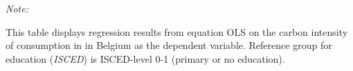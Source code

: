 \begin{table}[htbp!]
\begin{adjustbox}{width = 1\textwidth, max height = 0.95\textheight, center}
\begin{threeparttable}[b]
         \begin{tablenotes}\item \medskip \textit{Note:}
            \item This table displays regression results from equation OLS on the carbon intensity of consumption in  in Belgium as the dependent variable. Reference group for education (\textit{ISCED}) is ISCED-level 0-1 (primary or no education).
         \end{tablenotes}
      \end{threeparttable}
   \end{adjustbox}
\end{table}


